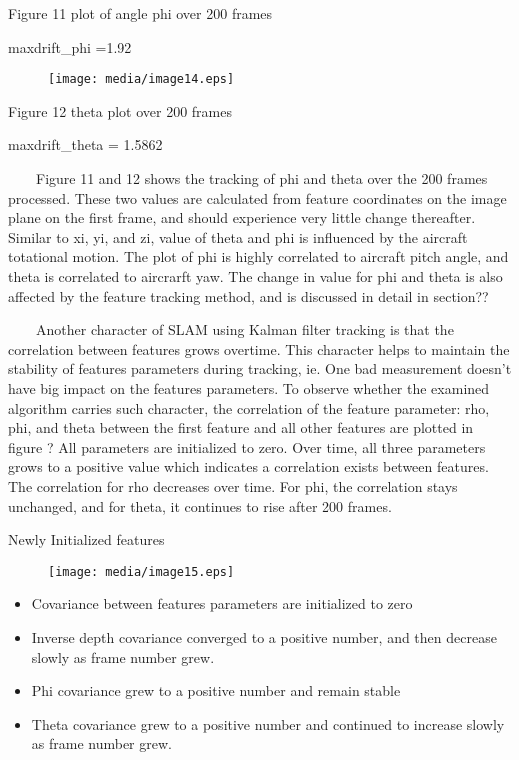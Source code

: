\begin{center}Figure 11 plot of angle phi over 200 frames\end{center}

maxdrift\_phi =1.92

\begin{figure}[h]
\centering
\texttt{[image: media/image14.eps]}
\end{figure}


\begin{center}Figure 12 theta plot over 200 frames\end{center}

maxdrift\_theta = 1.5862

\ \ \ \ Figure 11 and 12 shows the tracking of phi and theta over the 
200 frames processed. These two values are calculated from feature 
coordinates on the image plane on the first frame, and should experience 
very little change thereafter. Similar to xi, yi, and zi, value of theta 
and phi is influenced by the aircraft totational motion. The plot of phi 
is highly correlated to aircraft pitch angle, and theta is correlated to 
aircrarft yaw. The change in value for phi and theta is also affected by 
the feature tracking method, and is discussed in detail in section??

\ \ \ \ Another character of SLAM using Kalman filter tracking is that 
the correlation between features grows overtime. This character helps to 
maintain the stability of features parameters during tracking, ie. One 
bad measurement doesn't have big impact on the features parameters. To 
observe whether the examined algorithm carries such character, the 
correlation of the feature parameter: rho, phi, and theta between the 
first feature and all other features are plotted in figure ? All 
parameters are initialized to zero. Over time, all three parameters 
grows to a positive value which indicates a correlation exists between 
features. The correlation for rho decreases over time. For phi, the 
correlation stays unchanged, and for theta, it continues to rise after 
200 frames. 

Newly Initialized features

\begin{figure}[h]
\centering
\texttt{[image: media/image15.eps]}
\end{figure}


\begin{itemize}
\item Covariance between features parameters are initialized to zero
\item Inverse depth covariance converged to a positive number, and then 
decrease slowly as frame number grew.
\item Phi covariance grew to a positive number and remain stable
\item Theta covariance grew to a positive number and continued to 
increase slowly as frame number grew. 
\end{itemize}
\newpage


